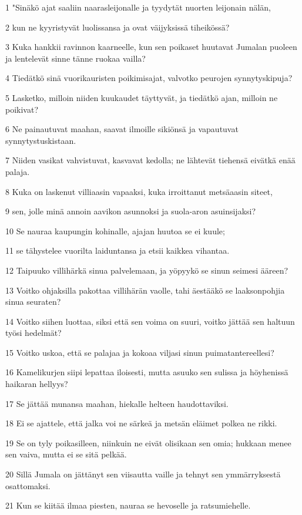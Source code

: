 \par 1 "Sinäkö ajat saaliin naarasleijonalle ja tyydytät nuorten leijonain nälän,
\par 2 kun ne kyyristyvät luolissansa ja ovat väijyksissä tiheikössä?
\par 3 Kuka hankkii ravinnon kaarneelle, kun sen poikaset huutavat Jumalan puoleen ja lentelevät sinne tänne ruokaa vailla?
\par 4 Tiedätkö sinä vuorikauristen poikimisajat, valvotko peurojen synnytyskipuja?
\par 5 Lasketko, milloin niiden kuukaudet täyttyvät, ja tiedätkö ajan, milloin ne poikivat?
\par 6 Ne painautuvat maahan, saavat ilmoille sikiönsä ja vapautuvat synnytystuskistaan.
\par 7 Niiden vasikat vahvistuvat, kasvavat kedolla; ne lähtevät tiehensä eivätkä enää palaja.
\par 8 Kuka on laskenut villiaasin vapaaksi, kuka irroittanut metsäaasin siteet,
\par 9 sen, jolle minä annoin aavikon asunnoksi ja suola-aron asuinsijaksi?
\par 10 Se nauraa kaupungin kohinalle, ajajan huutoa se ei kuule;
\par 11 se tähystelee vuorilta laiduntansa ja etsii kaikkea vihantaa.
\par 12 Taipuuko villihärkä sinua palvelemaan, ja yöpyykö se sinun seimesi ääreen?
\par 13 Voitko ohjaksilla pakottaa villihärän vaolle, tahi äestääkö se laaksonpohjia sinua seuraten?
\par 14 Voitko siihen luottaa, siksi että sen voima on suuri, voitko jättää sen haltuun työsi hedelmät?
\par 15 Voitko uskoa, että se palajaa ja kokoaa viljasi sinun puimatantereellesi?
\par 16 Kamelikurjen siipi lepattaa iloisesti, mutta asuuko sen sulissa ja höyhenissä haikaran hellyys?
\par 17 Se jättää munansa maahan, hiekalle helteen haudottaviksi.
\par 18 Ei se ajattele, että jalka voi ne särkeä ja metsän eläimet polkea ne rikki.
\par 19 Se on tyly poikasilleen, niinkuin ne eivät olisikaan sen omia; hukkaan menee sen vaiva, mutta ei se sitä pelkää.
\par 20 Sillä Jumala on jättänyt sen viisautta vaille ja tehnyt sen ymmärryksestä osattomaksi.
\par 21 Kun se kiitää ilmaa piesten, nauraa se hevoselle ja ratsumiehelle.
